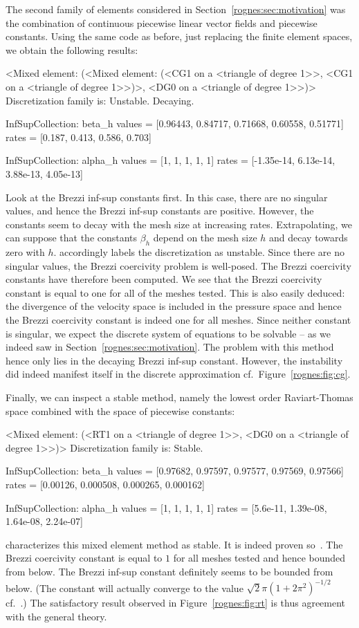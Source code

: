 The second family of elements considered in
Section~\ref{rognes:sec:motivation} was the combination of continuous
piecewise linear vector fields and piecewise constants. Using the same
code as before, just replacing the finite element spaces, we obtain
the following results:
\begin{python}
<Mixed element: (<Mixed element: (<CG1 on a <triangle of degree 1>>,
<CG1 on a <triangle of degree 1>>)>, <DG0 on a <triangle of degree 1>>)>
Discretization family is: Unstable. Decaying.

InfSupCollection: beta_h
values =         [0.96443, 0.84717, 0.71668, 0.60558, 0.51771]
rates  =         [0.187, 0.413, 0.586, 0.703]

InfSupCollection: alpha_h
values =         [1, 1, 1, 1, 1]
rates  =         [-1.35e-14, 6.13e-14, 3.88e-13, 4.05e-13]
\end{python}
Look at the Brezzi inf-sup constants first. In this case, there are no
singular values, and hence the Brezzi inf-sup constants are
positive. However, the constants seem to decay with the mesh size at
increasing rates. Extrapolating, we can suppose that the constants
$\beta_h$ depend on the mesh size $h$ and decay towards zero with
$h$. \rognesascot{} accordingly labels the discretization as
unstable. Since there are no singular values, the Brezzi coercivity
problem is well-posed. The Brezzi coercivity constants have therefore
been computed. We see that the Brezzi coercivity constant is equal to
one for all of the meshes tested. This is also easily deduced: the
divergence of the velocity space is included in the pressure space and
hence the Brezzi coercivity constant is indeed one for all
meshes. Since neither constant is singular, we expect the discrete
system of equations to be solvable -- as we indeed saw in
Section~\ref{rognes:sec:motivation}. The problem with this method
hence only lies in the decaying Brezzi inf-sup constant. However, the
instability did indeed manifest itself in the discrete approximation
cf.~Figure~\ref{rognes:fig:cg}.

Finally, we can inspect a stable method, namely the lowest order
Raviart-Thomas space combined with the space of piecewise constants:
\begin{python}
<Mixed element: (<RT1 on a <triangle of degree 1>>,
<DG0 on a <triangle of degree 1>>)>
Discretization family is: Stable.

InfSupCollection: beta_h
values =         [0.97682, 0.97597, 0.97577, 0.97569, 0.97566]
rates  =         [0.00126, 0.000508, 0.000265, 0.000162]

InfSupCollection: alpha_h
values =         [1, 1, 1, 1, 1]
rates  =         [5.6e-11, 1.39e-08, 1.64e-08, 2.24e-07]
\end{python}
\rognesascot{} characterizes this mixed element method as stable. It is
indeed proven so~\cite{RaviartThomas1977}. The Brezzi coercivity
constant is equal to $1$ for all meshes tested and hence bounded from
below. The Brezzi inf-sup constant definitely seems to be bounded from
below. (The constant will actually converge to the value $\sqrt{2} \pi
(1 + 2 \pi^2)^{-1/2}$ cf.~\cite{ArnoldRognes2009}.)
The satisfactory result observed in Figure~\ref{rognes:fig:rt} is thus
agreement with the general theory.

